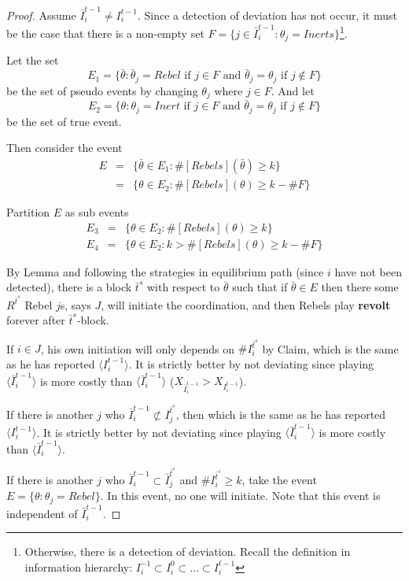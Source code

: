 \documentclass[12pt]{article}
\theoremstyle{remark}
\theoremstyle{remark}
\begin{document}
\begin{proof}
Assume $\bar{I}^{t-1}_i\neq I^{t-1}_i$. Since a detection of deviation has not occur, it must be the case that there is a non-empty set $F=\{j\in \bar{I}^{t-1}_i:\theta_j=Inerts\}$\footnote{Otherwise, there is a detection of deviation. Recall the definition in information hierarchy: $I^{-1}_i\subset I^{0}_i\subset...\subset I^{t-1}_i$}. 


Let the set 
\[E_1=\{\bar{\theta}: \bar{\theta}_j=Rebel \text{ if } j\in F \text { and }\bar{\theta}_j=\theta_j \text{ if } j\notin F\}\]
be the set of pseudo events by changing $\theta_j$ where $j\in F$. And let
\[E_2=\{\theta: \theta_j=Inert \text{ if }j\in F \text { and }\bar{\theta}_j=\theta_j \text{ if } j\notin F\}\]
be the set of true event.

Then consider the event
\begin{eqnarray*}
E 	&= &\{\bar{\theta}\in E_1: \#[Rebels](\bar{\theta})\geq k\}\\
 	&= &\{\theta\in E_2: \#[Rebels](\theta)\geq k-\#F\}
\end{eqnarray*}

Partition $E$ as sub events
\begin{eqnarray*}
E_3 	&= &\{\theta\in E_2: \#[Rebels](\theta)\geq k\}\\
E_4 	&= &\{\theta\in E_2: k>\#[Rebels](\theta)\geq k-\#F\}
\end{eqnarray*}

By Lemma and following the strategies in equilibrium path (since $i$ have not been detected), there is a block $\bar{t}^{s}$ with respect to $\bar{\theta}$ such that if $\bar{\theta}\in E$ then there some $R^{\bar{t}^s}$ Rebel $j$s, says $J$, will initiate the coordination, and then Rebels play \textbf{revolt} forever after $\bar{t}^s$-block.

If $i\in J$, his own initiation will only depends on $\# I^{\bar{t}^s}_i$ by Claim, which is the same as he has reported $\langle {I}^{t-1}_i\rangle$. It is strictly better by not deviating since playing $\langle\bar{I}^{t-1}_i\rangle$ is more costly than $\langle\bar{I}^{t-1}_i\rangle$ ($X_{\bar{I}^{t-1}_i}>X_{I^{t-1}_i}$).

If there is another $j$ who $\bar{I}^{t-1}_i\not\subset I^{\bar{t}^{s}}_j$, then which is the same as he has reported $\langle {I}^{t-1}_i\rangle$. It is strictly better by not deviating since playing $\langle\bar{I}^{t-1}_i\rangle$ is more costly than $\langle\bar{I}^{t-1}_i\rangle$.

If there is another $j$ who $\bar{I}^{t-1}_i\subset \bar{I}^{\bar{t}^{s}}_j$ and $\# I^{\bar{t}^s}_i\geq k$, take the event $E=\{\theta:\theta_j=Rebel\}$. In this event, no one will initiate. Note that this event is independent of $\bar{I}^{t-1}_i$. 





\end{proof}
\end{document}
